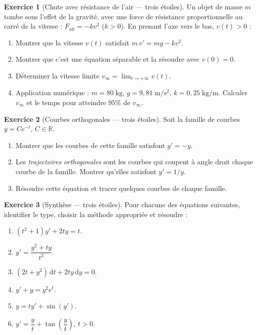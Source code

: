 \documentclass[12pt,a4paper,openany]{book}
\theoremstyle{definition}
\newtheorem{exercice}{Exercice}[chapter]
\theoremstyle{plain}
\theoremstyle{remark}
\newcommand{\R}{\mathbb{R}}
\newcommand{\dd}{\mathrm{d}}
\begin{document}
\begin{exercice}[Chute avec résistance de l'air --- {\small trois étoiles}]
\label{exo:ch2-chute}
Un objet de masse $m$ tombe sous l'effet de la gravité, avec une force de résistance proportionnelle au carré de la vitesse : $F_{\mathrm{air}} = -kv^2$ ($k > 0$). En prenant l'axe vers le bas, $v(t) > 0$ :
\begin{enumerate}[label=(\alph*)]
\item Montrer que la vitesse $v(t)$ satisfait $m\,v' = mg - kv^2$.
\item Montrer que c'est une équation séparable et la résoudre avec $v(0) = 0$.
\item Déterminer la vitesse limite $v_{\infty} = \lim_{t\to+\infty} v(t)$.
\item Application numérique : $m = 80\;\mathrm{kg}$, $g = 9{,}81\;\mathrm{m/s^2}$, $k = 0{,}25\;\mathrm{kg/m}$. Calculer $v_{\infty}$ et le temps pour atteindre $95\%$ de $v_{\infty}$.
\end{enumerate}
\end{exercice}

\begin{exercice}[Courbes orthogonales --- {\small trois étoiles}]
\label{exo:ch2-orthogonales}
Soit la famille de courbes $y = Ce^{-t}$, $C \in \R$.
\begin{enumerate}[label=(\alph*)]
\item Montrer que les courbes de cette famille satisfont $y' = -y$.
\item Les \emph{trajectoires orthogonales} sont les courbes qui coupent à angle droit chaque courbe de la famille. Montrer qu'elles satisfont $y' = 1/y$.
\item Résoudre cette équation et tracer quelques courbes de chaque famille.
\end{enumerate}
\end{exercice}

\begin{exercice}[Synthèse --- {\small trois étoiles}]
\label{exo:ch2-synthese}
Pour chacune des équations suivantes, identifier le type, choisir la méthode appropriée et résoudre :
\begin{enumerate}[label=(\alph*)]
\item $(t^2 + 1)y' + 2ty = t$.
\item $y' = \dfrac{y^2 + ty}{t^2}$.
\item $(2t + y^2)\,\dd t + 2ty\,\dd y = 0$.
\item $y' + y = y^2 e^t$.
\item $y = ty' + \sin(y')$.
\item $y' = \dfrac{y}{t} + \tan\!\left(\dfrac{y}{t}\right)$, $t > 0$.
\end{enumerate}
\end{exercice}
\end{document}
